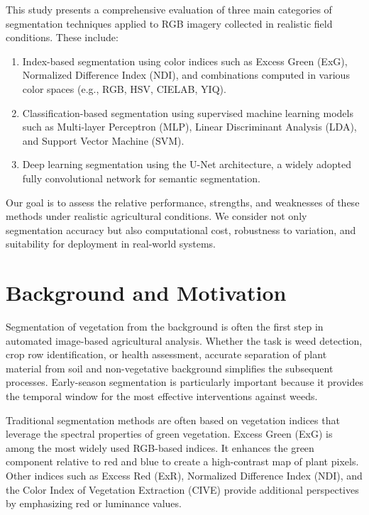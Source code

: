\documentclass[agriculture,article,submit,pdftex,moreauthors]{Definitions/mdpi}
\begin{document}
This study presents a comprehensive evaluation of three main categories of segmentation techniques applied to RGB imagery collected in realistic field conditions. These include:
\begin{enumerate}

	\item{Index-based segmentation using color indices such as Excess Green (ExG), Normalized Difference Index (NDI), and combinations computed in various color spaces (e.g., RGB, HSV, CIELAB, YIQ).}

	\item{Classification-based segmentation using supervised machine learning models such as Multi-layer Perceptron (MLP), Linear Discriminant Analysis (LDA), and Support Vector Machine (SVM).}

	\item{Deep learning segmentation using the U-Net architecture, a widely adopted fully convolutional network for semantic segmentation.}
	
\end{enumerate}

Our goal is to assess the relative performance, strengths, and weaknesses of these methods under realistic agricultural conditions. We consider not only segmentation accuracy but also computational cost, robustness to variation, and suitability for deployment in real-world systems.

\section{Background and Motivation}

Segmentation of vegetation from the background is often the first step in automated image-based agricultural analysis. Whether the task is weed detection, crop row identification, or health assessment, accurate separation of plant material from soil and non-vegetative background simplifies the subsequent processes. Early-season segmentation is particularly important because it provides the temporal window for the most effective interventions against weeds.

Traditional segmentation methods are often based on vegetation indices that leverage the spectral properties of green vegetation. Excess Green (ExG) is among the most widely used RGB-based indices. It enhances the green component relative to red and blue to create a high-contrast map of plant pixels. Other indices such as Excess Red (ExR), Normalized Difference Index (NDI), and the Color Index of Vegetation Extraction (CIVE) provide additional perspectives by emphasizing red or luminance values.
\end{document}
